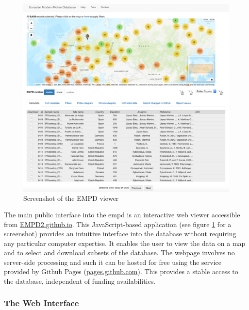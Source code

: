 \documentclass[
11pt, %
english, %
singlespacing, %
headsepline, %
]{MastersDoctoralThesis} %
\begin{document}
\begin{NoHyper}
\begin{refsection}
\begin{figure}[h]
	\includegraphics[width=\linewidth]{empd-figures/screenshot-compr.png}
	\caption{Screenshot of the EMPD viewer}
	\label{fig:empd-viewer}
\end{figure}

The main public interface into the \gls{empd} is an interactive web viewer accessible
from \href{https://EMPD2.github.io}{EMPD2.github.io}. This JavaScript-based application (see figure \ref{fig:empd-viewer} for a screenshot) provides an intuitive interface into the database without requiring any particular computer expertise. It enables the user to view the data on a map and to select and download subsets of the database. The webpage involves no server-side processing and such it can be hosted for free using the service provided by Github Pages (\href{https://pages.github.com/}{pages.github.com}). This provides a stable access to the database, independent of funding availabilities.

\subsubsection{The Web Interface}


\end{refsection}
\end{NoHyper}
\end{document}
